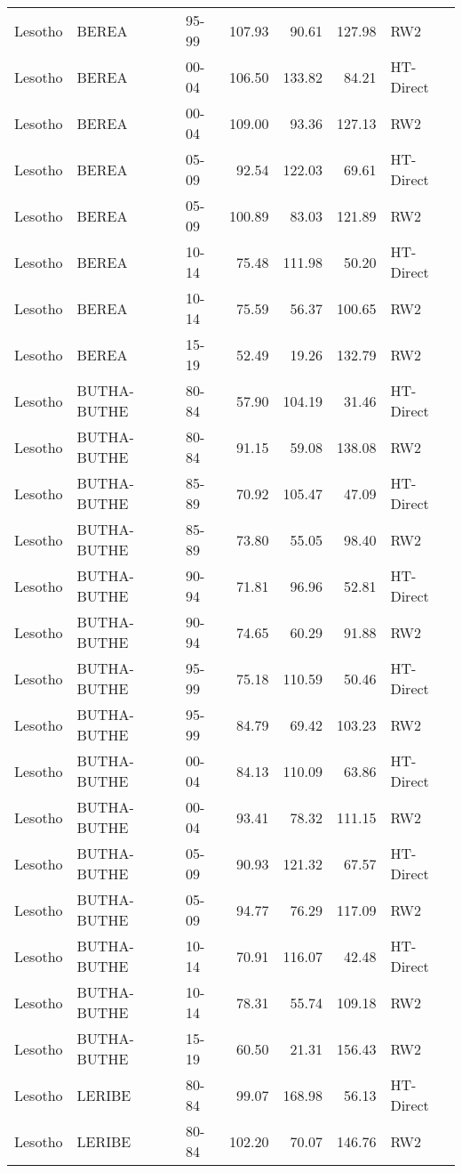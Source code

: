 \begin{longtable}{lllrrrl}
  Lesotho & BEREA & 95-99 & 107.93 & 90.61 & 127.98 & RW2 \\ 
  Lesotho & BEREA & 00-04 & 106.50 & 133.82 & 84.21 & HT-Direct \\ 
  Lesotho & BEREA & 00-04 & 109.00 & 93.36 & 127.13 & RW2 \\ 
  Lesotho & BEREA & 05-09 & 92.54 & 122.03 & 69.61 & HT-Direct \\ 
  Lesotho & BEREA & 05-09 & 100.89 & 83.03 & 121.89 & RW2 \\ 
  Lesotho & BEREA & 10-14 & 75.48 & 111.98 & 50.20 & HT-Direct \\ 
  Lesotho & BEREA & 10-14 & 75.59 & 56.37 & 100.65 & RW2 \\ 
  Lesotho & BEREA & 15-19 & 52.49 & 19.26 & 132.79 & RW2 \\ 
  Lesotho & BUTHA-BUTHE & 80-84 & 57.90 & 104.19 & 31.46 & HT-Direct \\ 
  Lesotho & BUTHA-BUTHE & 80-84 & 91.15 & 59.08 & 138.08 & RW2 \\ 
  Lesotho & BUTHA-BUTHE & 85-89 & 70.92 & 105.47 & 47.09 & HT-Direct \\ 
  Lesotho & BUTHA-BUTHE & 85-89 & 73.80 & 55.05 & 98.40 & RW2 \\ 
  Lesotho & BUTHA-BUTHE & 90-94 & 71.81 & 96.96 & 52.81 & HT-Direct \\ 
  Lesotho & BUTHA-BUTHE & 90-94 & 74.65 & 60.29 & 91.88 & RW2 \\ 
  Lesotho & BUTHA-BUTHE & 95-99 & 75.18 & 110.59 & 50.46 & HT-Direct \\ 
  Lesotho & BUTHA-BUTHE & 95-99 & 84.79 & 69.42 & 103.23 & RW2 \\ 
  Lesotho & BUTHA-BUTHE & 00-04 & 84.13 & 110.09 & 63.86 & HT-Direct \\ 
  Lesotho & BUTHA-BUTHE & 00-04 & 93.41 & 78.32 & 111.15 & RW2 \\ 
  Lesotho & BUTHA-BUTHE & 05-09 & 90.93 & 121.32 & 67.57 & HT-Direct \\ 
  Lesotho & BUTHA-BUTHE & 05-09 & 94.77 & 76.29 & 117.09 & RW2 \\ 
  Lesotho & BUTHA-BUTHE & 10-14 & 70.91 & 116.07 & 42.48 & HT-Direct \\ 
  Lesotho & BUTHA-BUTHE & 10-14 & 78.31 & 55.74 & 109.18 & RW2 \\ 
  Lesotho & BUTHA-BUTHE & 15-19 & 60.50 & 21.31 & 156.43 & RW2 \\ 
  Lesotho & LERIBE & 80-84 & 99.07 & 168.98 & 56.13 & HT-Direct \\ 
  Lesotho & LERIBE & 80-84 & 102.20 & 70.07 & 146.76 & RW2 \\ 

\end{longtable}
